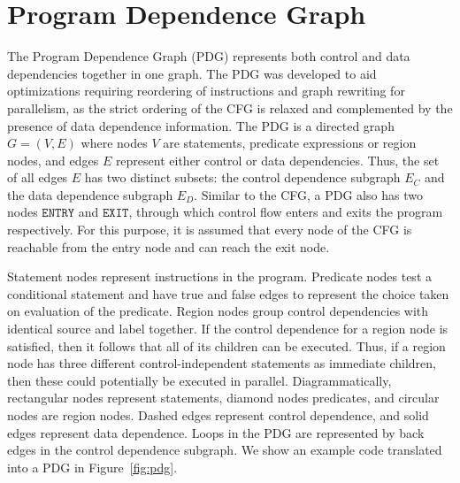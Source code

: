 \section{Program Dependence Graph}
\label{section:vsdg:pdg}
The Program Dependence Graph (PDG) represents both control and data dependencies together in one graph. 
The PDG was developed to aid optimizations requiring reordering of instructions and graph rewriting for parallelism, as the strict ordering of the CFG is relaxed and complemented by the presence of data dependence information. 
The PDG is a directed graph $G=(V,E)$ where nodes $V$ are statements, predicate expressions or region nodes, and edges $E$ represent either control or data dependencies. 
Thus, the set of all edges $E$ has two distinct subsets: 
the control dependence subgraph $E_{C}$ and the data dependence subgraph $E_{D}$.
Similar to the CFG, a PDG also has two nodes $\texttt{ENTRY}$ and $\texttt{EXIT}$, through which control flow enters and exits the program respectively. 
For this purpose, it is assumed that every node of the CFG is reachable from the entry node and can reach the exit node.

Statement nodes represent instructions in the program. 
Predicate nodes test a conditional statement and have {\sf true} and {\sf false} edges to represent the choice taken on evaluation of the predicate. 
Region nodes group control dependencies with identical source and label together. 
If the control dependence for a region node is satisfied, then it follows that all of its children can be executed. 
Thus, if a region node has three different control-independent statements as immediate children, then these could potentially be executed in parallel. 
Diagrammatically, rectangular nodes represent statements, diamond nodes predicates, and circular nodes are region nodes. 
Dashed edges represent control dependence, and solid edges represent data dependence. 
Loops in the PDG are represented by back edges in the control dependence subgraph. 
We show an example code translated into a PDG in Figure~\ref{fig:pdg}.

